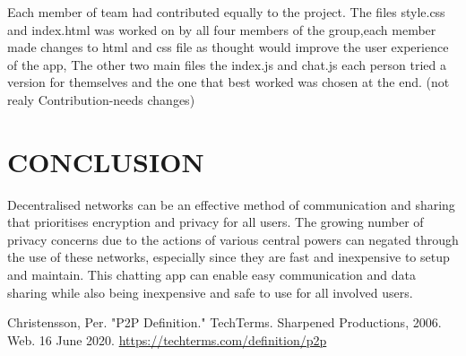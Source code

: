 \documentclass{fisatproject}
\begin{document}
Each member of team had contributed equally to the project. The files style.css and index.html was worked on by all four members of the group,each member made changes to html and css file as thought would improve the user experience of the app, The other two main files the index.js and chat.js each person tried a version for themselves and the one that best worked was chosen at the end. (not realy Contribution-needs changes)






\chapter{CONCLUSION}

Decentralised networks can be an effective method of communication and sharing that prioritises encryption and privacy for all users. The growing number of privacy concerns due to the actions of various central powers can negated through the use of these networks, especially since they are fast and inexpensive to setup and maintain. This chatting app can enable easy communication and data sharing while also being inexpensive and safe to use for all involved users.
\newpage



\begin{thebibliography}{1}
	 Christensson, Per. "P2P Definition." TechTerms. Sharpened Productions, 2006. Web. 16 June 2020. 
	\url{https://techterms.com/definition/p2p}
	
\end{thebibliography}
\end{document}
